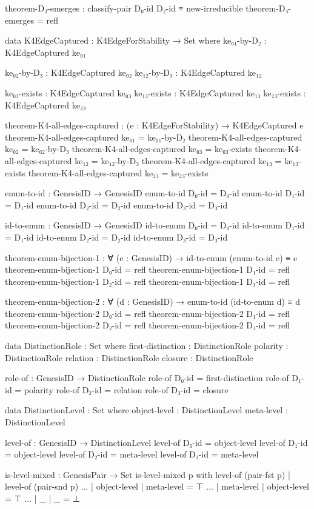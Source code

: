 \documentclass[11pt,a4paper]{book}
\begin{document}
\begin{code}
theorem-D₃-emerges : classify-pair D₀-id D₂-id ≡ new-irreducible
theorem-D₃-emerges = refl

data K4EdgeCaptured : K4EdgeForStability → Set where
  ke₀₁-by-D₂ : K4EdgeCaptured ke₀₁
  
  ke₀₂-by-D₃ : K4EdgeCaptured ke₀₂
  ke₁₂-by-D₃ : K4EdgeCaptured ke₁₂
  
  ke₀₃-exists : K4EdgeCaptured ke₀₃
  ke₁₃-exists : K4EdgeCaptured ke₁₃
  ke₂₃-exists : K4EdgeCaptured ke₂₃

theorem-K4-all-edges-captured : (e : K4EdgeForStability) → K4EdgeCaptured e
theorem-K4-all-edges-captured ke₀₁ = ke₀₁-by-D₂
theorem-K4-all-edges-captured ke₀₂ = ke₀₂-by-D₃
theorem-K4-all-edges-captured ke₀₃ = ke₀₃-exists
theorem-K4-all-edges-captured ke₁₂ = ke₁₂-by-D₃
theorem-K4-all-edges-captured ke₁₃ = ke₁₃-exists
theorem-K4-all-edges-captured ke₂₃ = ke₂₃-exists

enum-to-id : GenesisID → GenesisID
enum-to-id D₀-id = D₀-id
enum-to-id D₁-id = D₁-id
enum-to-id D₂-id = D₂-id
enum-to-id D₃-id = D₃-id

id-to-enum : GenesisID → GenesisID
id-to-enum D₀-id = D₀-id
id-to-enum D₁-id = D₁-id
id-to-enum D₂-id = D₂-id
id-to-enum D₃-id = D₃-id

theorem-enum-bijection-1 : ∀ (e : GenesisID) → id-to-enum (enum-to-id e) ≡ e
theorem-enum-bijection-1 D₀-id = refl
theorem-enum-bijection-1 D₁-id = refl
theorem-enum-bijection-1 D₂-id = refl
theorem-enum-bijection-1 D₃-id = refl

theorem-enum-bijection-2 : ∀ (d : GenesisID) → enum-to-id (id-to-enum d) ≡ d
theorem-enum-bijection-2 D₀-id = refl
theorem-enum-bijection-2 D₁-id = refl
theorem-enum-bijection-2 D₂-id = refl
theorem-enum-bijection-2 D₃-id = refl

data DistinctionRole : Set where
  first-distinction : DistinctionRole
  polarity         : DistinctionRole
  relation         : DistinctionRole
  closure          : DistinctionRole

role-of : GenesisID → DistinctionRole
role-of D₀-id = first-distinction
role-of D₁-id = polarity
role-of D₂-id = relation
role-of D₃-id = closure

data DistinctionLevel : Set where
  object-level : DistinctionLevel
  meta-level   : DistinctionLevel

level-of : GenesisID → DistinctionLevel
level-of D₀-id = object-level
level-of D₁-id = object-level  
level-of D₂-id = meta-level
level-of D₃-id = meta-level

is-level-mixed : GenesisPair → Set
is-level-mixed p with level-of (pair-fst p) | level-of (pair-snd p)
... | object-level | meta-level = ⊤
... | meta-level | object-level = ⊤
... | _ | _ = ⊥


\end{code}
\end{document}
